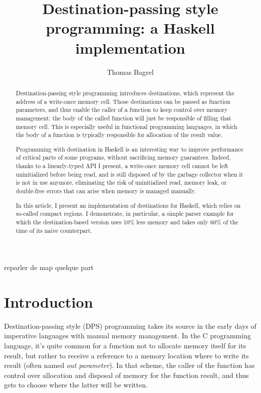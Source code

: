 \documentclass[english]{jflart}
\title{Destination-passing style programming: a Haskell implementation}
\author[1]{Thomas Bagrel}
\affil[1]{INRIA/LORIA, Vand\oe{}uvre-lès-Nancy, 54500, France}
\affil[1]{TWEAG, Paris, 75012, France}
\newcommand{\TODO}[1]{{\color{red}\large #1}}
\begin{document}
\maketitle

\begin{abstract}
Destination-passing style programming introduces destinations, which represent the address of a write-once memory cell. Those destinations can be passed as function parameters, and thus enable the caller of a function to keep control over memory management: the body of the called function will just be responsible of filling that memory cell. This is especially useful in functional programming languages, in which the body of a function is typically responsible for allocation of the result value.

Programming with destination in Haskell is an interesting way to improve performance of critical parts of some programs, without sacrificing memory guarantees. Indeed, thanks to a linearly-typed API I present, a write-once memory cell cannot be left uninitialized before being read, and is still disposed of by the garbage collector when it is not in use anymore, eliminating the risk of uninitialized read, memory leak, or double-free errors that can arise when memory is managed manually.

In this article, I present an implementation of destinations for Haskell, which relies on so-called compact regions. I demonstrate, in particular, a simple parser example for which the destination-based version uses 10\% less memory and takes only 60\% of the time of its naive counterpart.
\end{abstract}


\TODO{reparler de map quelque part}

\section{Introduction}

Destination-passing style (DPS) programming takes its source in the early days of imperative languages with manual memory management. In the C programming language, it's quite common for a function not to allocate memory itself for its result, but rather to receive a reference to a memory location where to write its result (often named \emph{out parameter}). In that scheme, the caller of the function has control over allocation and disposal of memory for the function result, and thus gets to choose where the latter will be written.
\end{document}

